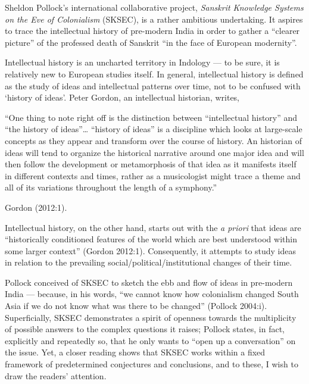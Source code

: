 Sheldon Pollock’s international collaborative project, {\sl Sanskrit Knowledge Systems on the Eve of Colonialism} (SKSEC), is a rather ambitious undertaking. It aspires to trace the intellectual history of pre-modern India in order to gather a “clearer picture” of the professed death of Sanskrit “in the face of European modernity”. 

Intellectual history is an uncharted territory in Indology — to be sure, it is relatively new to European studies itself. In general, intellectual history is defined as the study of ideas and intellectual patterns over time, not to be confused with ‘history of ideas’. Peter Gordon, an intellectual historian, writes, 
\begin{myquote}
“One thing to note right off is the distinction between “intellectual history” and “the history of ideas”… “history of ideas” is a discipline which looks at large-scale concepts as they appear and transform over the course of history. An historian of ideas will tend to organize the historical narrative around one major idea and will then follow the development or metamorphosis of that idea as it manifests itself in different contexts and times, rather as a musicologist might trace a theme and all of its variations throughout the length of a symphony.” 

\hfill{Gordon (2012:1).}
\end{myquote}

Intellectual history, on the other hand, starts out with the  {\sl a priori} that ideas are “historically conditioned features of the world which are best understood within some larger context”  (Gordon 2012:1). Consequently, it attempts to study ideas in relation to the prevailing social/political/institutional changes of their time. 

Pollock conceived of SKSEC to sketch the ebb and flow of ideas in pre-modern India — because, in his words, “we cannot know how colonialism changed South Asia if we do not know what was there to be changed” (Pollock 2004:i). Superficially, SKSEC demonstrates a spirit of openness towards the multiplicity of possible answers to the complex questions it raises; Pollock states, in fact, explicitly and repeatedly so, that he only wants to “open up a conversation” on the issue. Yet, a closer reading shows that SKSEC works within a fixed framework of predetermined conjectures and conclusions, and to these, I wish to draw the readers’ attention. 

